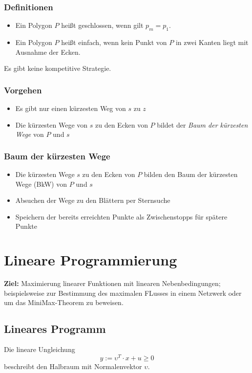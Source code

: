 \subsubsection{Definitionen}
\begin{itemize}
	\item Ein Polygon \(P\) heißt geschlossen, wenn gilt \(p_m = p_1\).
	\item Ein Polygon \(P\) heißt einfach, wenn kein Punkt von \(P\) in zwei Kanten liegt mit Ausnahme der Ecken.
\end{itemize}
Es gibt keine kompetitive Strategie.

\subsubsection{Vorgehen}
\begin{itemize}
	\item Es gibt nur einen kürzesten Weg von \(s\) zu \(z\)
	\item Die kürzesten Wege von \(s\) zu den Ecken von \(P\) bildet der \textit{Baum der kürzesten Wege} von \(P\) und \(s\)
\end{itemize}

\subsubsection{Baum der kürzesten Wege}
\begin{itemize}
	\item Die kürzesten Wege \(s\) zu den Ecken von \(P\) bilden den Baum der kürzesten Wege (BkW) von \(P\) und \(s\)
	\item Absuchen der Wege zu den Blättern per Sternsuche
	\item Speichern der bereits erreichten Punkte als Zwischenstopps für spätere Punkte
\end{itemize}



\section{Lineare Programmierung}
\textbf{Ziel:} Maximierung linearer Funktionen mit linearen Nebenbedingungen; beispielsweise zur Bestimmung des maximalen FLusses in einem Netzwerk oder um das MiniMax-Theorem zu beweisen.

\subsection{Lineares Programm}
Die lineare Ungleichung
\[y := \upsilon^T \cdot x + u \geq 0\]
beschreibt den Halbraum mit Normalenvektor \(\upsilon\).

